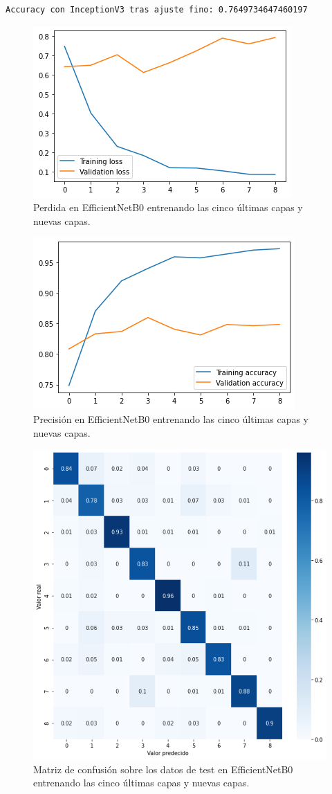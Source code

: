 \begin{lstlisting}
Accuracy con InceptionV3 tras ajuste fino: 0.7649734647460197
\end{lstlisting}






\begin{figure}[H]
  \centering
  \includegraphics[width=0.5\linewidth]{Imagenes/entrenamiento_redes/5-ult/efficientnet_5ult_loss.png}
  \caption{Perdida en EfficientNetB0 entrenando las cinco últimas capas y nuevas capas.}
\end{figure}

\begin{figure}[H]
  \centering
  \includegraphics[width=0.5\linewidth]{Imagenes/entrenamiento_redes/5-ult/efficientnet_5ult_acc.png}
  \caption{Precisión en EfficientNetB0 entrenando las cinco últimas capas y nuevas capas.}
\end{figure}

\begin{figure}[H]
  \centering
  \includegraphics[width=0.5\linewidth]{Imagenes/entrenamiento_redes/5-ult/efficientnet_5ult_matriz.png}
  \caption{Matriz de confusión sobre los datos de test en EfficientNetB0 entrenando las cinco últimas capas y nuevas capas.}
\end{figure}


